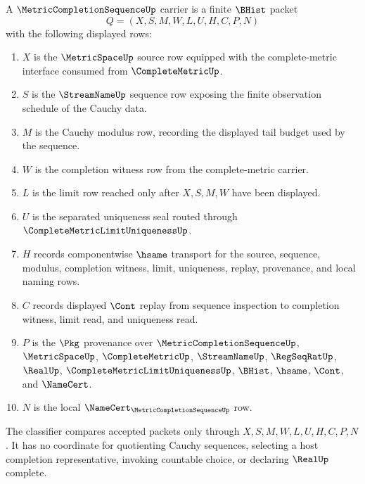 \begin{definition}
\label{def:metric-completion-sequence-carrier}
A $\MetricCompletionSequenceUp$ carrier is a finite $\BHist$ packet
$$
Q=(X,S,M,W,L,U,H,C,P,N)
$$
with the following displayed rows:
\begin{enumerate}
\item $X$ is the $\MetricSpaceUp$ source row equipped with the complete-metric interface consumed from $\CompleteMetricUp$.
\item $S$ is the $\StreamNameUp$ sequence row exposing the finite observation schedule of the Cauchy data.
\item $M$ is the Cauchy modulus row, recording the displayed tail budget used by the sequence.
\item $W$ is the completion witness row from the complete-metric carrier.
\item $L$ is the limit row reached only after $X,S,M,W$ have been displayed.
\item $U$ is the separated uniqueness seal routed through $\CompleteMetricLimitUniquenessUp$.
\item $H$ records componentwise $\hsame$ transport for the source, sequence, modulus, completion witness, limit, uniqueness, replay, provenance, and local naming rows.
\item $C$ records displayed $\Cont$ replay from sequence inspection to completion witness, limit read, and uniqueness read.
\item $P$ is the $\Pkg$ provenance over $\MetricCompletionSequenceUp$, $\MetricSpaceUp$, $\CompleteMetricUp$, $\StreamNameUp$, $\RegSeqRatUp$, $\RealUp$, $\CompleteMetricLimitUniquenessUp$, $\BHist$, $\hsame$, $\Cont$, and $\NameCert$.
\item $N$ is the local $\NameCert_{\MetricCompletionSequenceUp}$ row.
\end{enumerate}
The classifier compares accepted packets only through $X,S,M,W,L,U,H,C,P,N$. It has no coordinate for quotienting Cauchy sequences, selecting a host completion representative, invoking countable choice, or declaring $\RealUp$ complete.
\end{definition}

